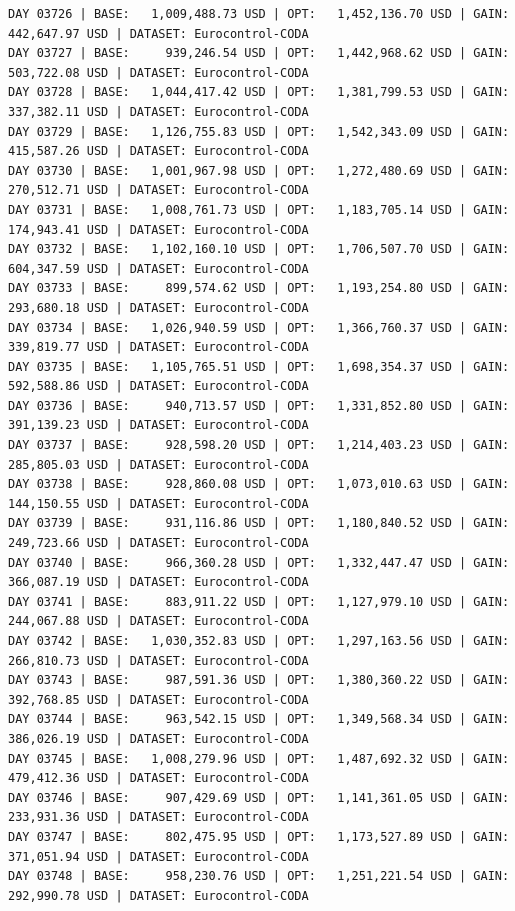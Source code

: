 \documentclass[11pt,a4paper]{article}
\begin{document}
\begin{verbatim}
DAY 03726 | BASE:   1,009,488.73 USD | OPT:   1,452,136.70 USD | GAIN: 442,647.97 USD | DATASET: Eurocontrol-CODA
DAY 03727 | BASE:     939,246.54 USD | OPT:   1,442,968.62 USD | GAIN: 503,722.08 USD | DATASET: Eurocontrol-CODA
DAY 03728 | BASE:   1,044,417.42 USD | OPT:   1,381,799.53 USD | GAIN: 337,382.11 USD | DATASET: Eurocontrol-CODA
DAY 03729 | BASE:   1,126,755.83 USD | OPT:   1,542,343.09 USD | GAIN: 415,587.26 USD | DATASET: Eurocontrol-CODA
DAY 03730 | BASE:   1,001,967.98 USD | OPT:   1,272,480.69 USD | GAIN: 270,512.71 USD | DATASET: Eurocontrol-CODA
DAY 03731 | BASE:   1,008,761.73 USD | OPT:   1,183,705.14 USD | GAIN: 174,943.41 USD | DATASET: Eurocontrol-CODA
DAY 03732 | BASE:   1,102,160.10 USD | OPT:   1,706,507.70 USD | GAIN: 604,347.59 USD | DATASET: Eurocontrol-CODA
DAY 03733 | BASE:     899,574.62 USD | OPT:   1,193,254.80 USD | GAIN: 293,680.18 USD | DATASET: Eurocontrol-CODA
DAY 03734 | BASE:   1,026,940.59 USD | OPT:   1,366,760.37 USD | GAIN: 339,819.77 USD | DATASET: Eurocontrol-CODA
DAY 03735 | BASE:   1,105,765.51 USD | OPT:   1,698,354.37 USD | GAIN: 592,588.86 USD | DATASET: Eurocontrol-CODA
DAY 03736 | BASE:     940,713.57 USD | OPT:   1,331,852.80 USD | GAIN: 391,139.23 USD | DATASET: Eurocontrol-CODA
DAY 03737 | BASE:     928,598.20 USD | OPT:   1,214,403.23 USD | GAIN: 285,805.03 USD | DATASET: Eurocontrol-CODA
DAY 03738 | BASE:     928,860.08 USD | OPT:   1,073,010.63 USD | GAIN: 144,150.55 USD | DATASET: Eurocontrol-CODA
DAY 03739 | BASE:     931,116.86 USD | OPT:   1,180,840.52 USD | GAIN: 249,723.66 USD | DATASET: Eurocontrol-CODA
DAY 03740 | BASE:     966,360.28 USD | OPT:   1,332,447.47 USD | GAIN: 366,087.19 USD | DATASET: Eurocontrol-CODA
DAY 03741 | BASE:     883,911.22 USD | OPT:   1,127,979.10 USD | GAIN: 244,067.88 USD | DATASET: Eurocontrol-CODA
DAY 03742 | BASE:   1,030,352.83 USD | OPT:   1,297,163.56 USD | GAIN: 266,810.73 USD | DATASET: Eurocontrol-CODA
DAY 03743 | BASE:     987,591.36 USD | OPT:   1,380,360.22 USD | GAIN: 392,768.85 USD | DATASET: Eurocontrol-CODA
DAY 03744 | BASE:     963,542.15 USD | OPT:   1,349,568.34 USD | GAIN: 386,026.19 USD | DATASET: Eurocontrol-CODA
DAY 03745 | BASE:   1,008,279.96 USD | OPT:   1,487,692.32 USD | GAIN: 479,412.36 USD | DATASET: Eurocontrol-CODA
DAY 03746 | BASE:     907,429.69 USD | OPT:   1,141,361.05 USD | GAIN: 233,931.36 USD | DATASET: Eurocontrol-CODA
DAY 03747 | BASE:     802,475.95 USD | OPT:   1,173,527.89 USD | GAIN: 371,051.94 USD | DATASET: Eurocontrol-CODA
DAY 03748 | BASE:     958,230.76 USD | OPT:   1,251,221.54 USD | GAIN: 292,990.78 USD | DATASET: Eurocontrol-CODA

\end{verbatim}
\end{document}
